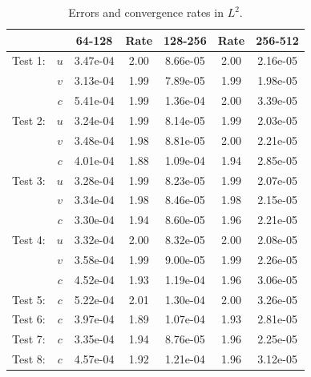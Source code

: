 \documentclass[final]{siamltex}
\begin{document}
\begin{table}[h]
\begin{center}
\caption{Errors and convergence rates in $L^2$.}
\label{tab:L2}
\begin{tabular}{ccccccc}
& & 64-128 & Rate & 128-256 & Rate & 256-512 \\
\hline
Test 1:             & $u$ & 3.47e-04 & 2.00 & 8.66e-05 & 2.00 & 2.16e-05 \\
                    & $v$ & 3.13e-04 & 1.99 & 7.89e-05 & 1.99 & 1.98e-05 \\
                    & $c$ & 5.41e-04 & 1.99 & 1.36e-04 & 2.00 & 3.39e-05 \\
\hline
Test 2:             & $u$ & 3.24e-04 & 1.99 & 8.14e-05 & 1.99 & 2.03e-05 \\
                    & $v$ & 3.48e-04 & 1.98 & 8.81e-05 & 2.00 & 2.21e-05 \\
                    & $c$ & 4.01e-04 & 1.88 & 1.09e-04 & 1.94 & 2.85e-05 \\
\hline
Test 3:             & $u$ & 3.28e-04 & 1.99 & 8.23e-05 & 1.99 & 2.07e-05 \\
                    & $v$ & 3.34e-04 & 1.98 & 8.46e-05 & 1.98 & 2.15e-05 \\
                    & $c$ & 3.30e-04 & 1.94 & 8.60e-05 & 1.96 & 2.21e-05 \\
\hline
Test 4:             & $u$ & 3.32e-04 & 2.00 & 8.32e-05 & 2.00 & 2.08e-05 \\
                    & $v$ & 3.58e-04 & 1.99 & 9.00e-05 & 1.99 & 2.26e-05 \\
                    & $c$ & 4.52e-04 & 1.93 & 1.19e-04 & 1.96 & 3.06e-05 \\
\hline
Test 5:             & $c$ & 5.22e-04 & 2.01 & 1.30e-04 & 2.00 & 3.26e-05 \\
\hline
Test 6:             & $c$ & 3.97e-04 & 1.89 & 1.07e-04 & 1.93 & 2.81e-05 \\
\hline
Test 7:             & $c$ & 3.35e-04 & 1.94 & 8.76e-05 & 1.96 & 2.25e-05 \\
\hline
Test 8:             & $c$ & 4.57e-04 & 1.92 & 1.21e-04 & 1.96 & 3.12e-05
\end{tabular}
\end{center}
\end{table}
\end{document}
